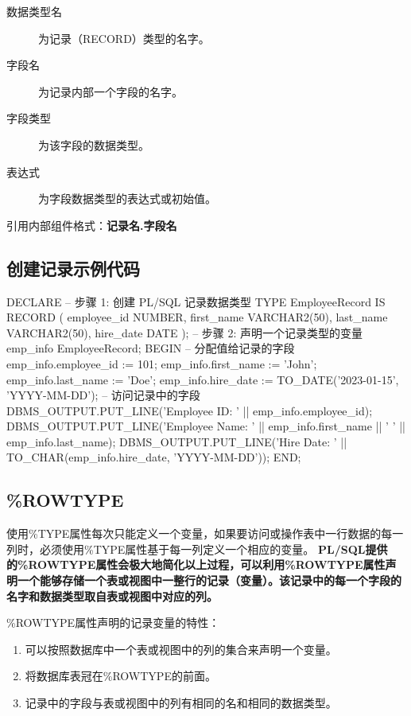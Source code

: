\documentclass[11pt, a4paper, oneside, UTF8]{ctexbook}
\let\kaishu\relax %
\begin{document}
\begin{description}
  \item[数据类型名] 为记录（RECORD）类型的名字。
  \item[字段名] 为记录内部一个字段的名字。
  \item[字段类型] 为该字段的数据类型。
  \item[表达式] 为字段数据类型的表达式或初始值。
\end{description}

引用内部组件格式：{\bfseries\kaishu 记录名.字段名}

\subsection{创建记录示例代码}

\begin{plsql}[caption=使用记录类型变量示例]
DECLARE
  -- 步骤 1: 创建 PL/SQL 记录数据类型
  TYPE EmployeeRecord IS RECORD (
    employee_id NUMBER,
    first_name VARCHAR2(50),
    last_name VARCHAR2(50),
    hire_date DATE
  );
  -- 步骤 2: 声明一个记录类型的变量
  emp_info EmployeeRecord;
BEGIN
  -- 分配值给记录的字段
  emp_info.employee_id := 101;
  emp_info.first_name := 'John';
  emp_info.last_name := 'Doe';
  emp_info.hire_date := TO_DATE('2023-01-15', 'YYYY-MM-DD');
  -- 访问记录中的字段
  DBMS_OUTPUT.PUT_LINE('Employee ID: ' || emp_info.employee_id);
  DBMS_OUTPUT.PUT_LINE('Employee Name: ' || emp_info.first_name || ' ' || emp_info.last_name);
  DBMS_OUTPUT.PUT_LINE('Hire Date: ' || TO_CHAR(emp_info.hire_date, 'YYYY-MM-DD'));
END;
\end{plsql}

\subsection{\%ROWTYPE}
使用\%TYPE属性每次只能定义一个变量，如果要访问或操作表中一行数据的每一列时，必须使用\%TYPE属性基于每一列定义一个相应的变量。
{\bfseries\kaishu PL/SQL提供的\%ROWTYPE属性会极大地简化以上过程，可以利用\%ROWTYPE属性声明一个能够存储一个表或视图中一整行的记录（变量）。该记录中的每一个字段的名字和数据类型取自表或视图中对应的列。}

\%ROWTYPE属性声明的记录变量的特性：
\begin{enumerate}
  \item 可以按照数据库中一个表或视图中的列的集合来声明一个变量。
  \item 将数据库表冠在\%ROWTYPE的前面。
  \item 记录中的字段与表或视图中的列有相同的名和相同的数据类型。
\end{enumerate}
\end{document}
